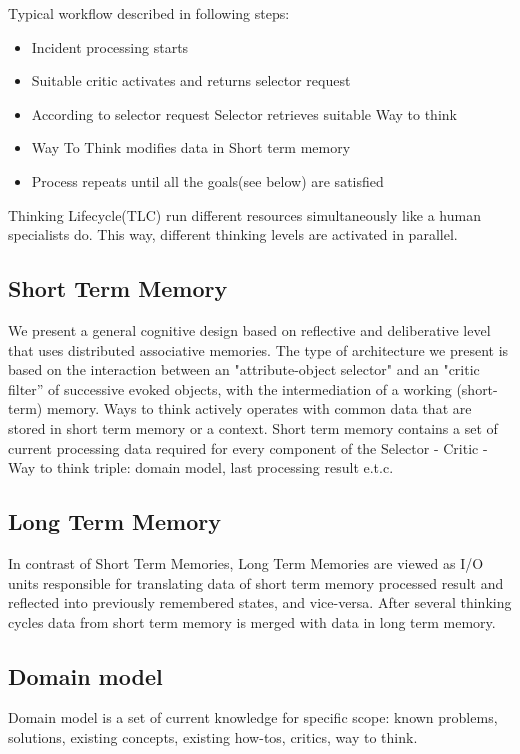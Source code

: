 \documentclass[runningheads,a4paper]{llncs}
\begin{document}
\begin{enumerate}
Typical workflow described in following steps:
\begin{itemize}
 \item Incident processing starts
 \item Suitable critic activates and returns selector request
 \item According to selector request Selector retrieves suitable Way to think
 \item Way To Think modifies data in Short term memory
 \item Process repeats until all the goals(see below) are satisfied
\end{itemize}

Thinking Lifecycle(TLC) run different resources simultaneously like a human specialists do. This way, different thinking levels are activated in parallel.

\subsection{Short Term Memory}
We present a general cognitive design based on reflective and deliberative level that uses distributed associative memories. The type of architecture we present is based on the interaction between an "attribute-object selector" and an "critic filter” of successive evoked objects, with the intermediation of a working (short-term) memory.
Ways to think actively operates with common data that are stored in short term memory or a context. Short term memory contains a set of current processing data required for every component of the Selector -\> Critic -\> Way to think triple: domain model, last processing result e.t.c.

\subsection{Long Term Memory}
In contrast of Short Term Memories, Long Term Memories are viewed as I/O units responsible for translating data of short term memory processed result and reflected into previously remembered states, and vice-versa. After several thinking cycles data from short term memory is merged with data in long term memory.

\subsection{Domain model}
Domain model is a set of current knowledge for specific scope: known problems, solutions, existing concepts, existing how-tos, critics, way to think.\\


\end{enumerate}
\end{document}
